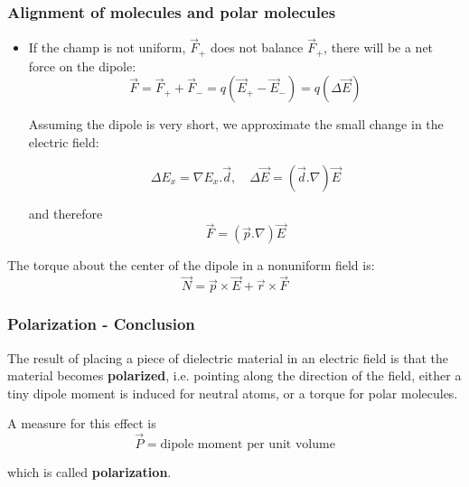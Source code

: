 \begin{frame}
  \frametitle{Alignment of molecules and polar molecules}



  \begin{itemize}

      \item If the champ is not uniform, $\overrightarrow{F}_+$ does not balance $\overrightarrow{F}_+$, there will be a net force on the dipole:
        \begin{equation}
          \overrightarrow{F} = \overrightarrow{F}_+ + \overrightarrow{F}_- = q(\overrightarrow{E}_+ - \overrightarrow{E}_-) = q(\Delta \overrightarrow{E})
        \end{equation}

  Assuming the dipole is very short, we approximate the small change in the electric field:

  \begin{equation}
    \Delta E_x = \nabla E_x . \overrightarrow{d},\quad \Delta \overrightarrow{E} = (\overrightarrow{d}. \nabla) \overrightarrow{E}
  \end{equation}

  and therefore 
  \begin{equation}
    \overrightarrow{F} = (\overrightarrow{p}.\nabla)\overrightarrow{E}
  \end{equation}



  \end{itemize}

  The torque about the center of the dipole in a nonuniform field is:
  \begin{equation}
    \overrightarrow{N} = \overrightarrow{p} \times \overrightarrow{E} + \overrightarrow{r} \times \overrightarrow{F}
  \end{equation}

\end{frame}
\begin{frame}
  \frametitle{Polarization - Conclusion}

  The result of placing a piece of dielectric material in an electric field is that the material becomes \textbf{polarized}, i.e. pointing along the direction of the field, either a tiny dipole moment is induced for neutral atoms, or a torque for polar molecules.

  A measure for this effect is 
  \begin{equation}
    \overrightarrow{P} = \text{dipole moment per unit volume}
  \end{equation}

  which is called \textbf{polarization}.

\end{frame}


